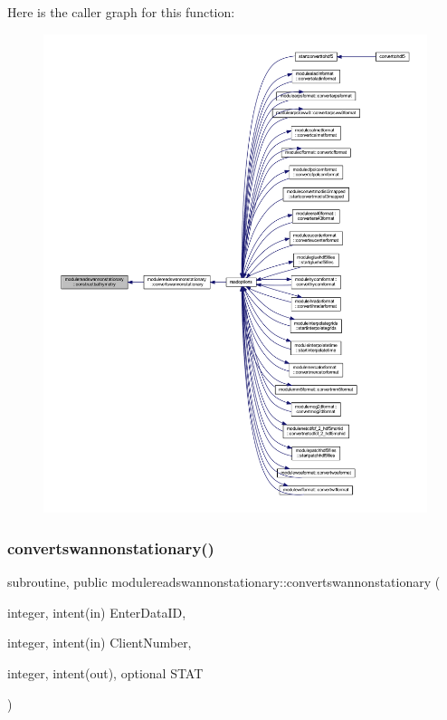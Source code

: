 Here is the caller graph for this function\+:\nopagebreak
\begin{figure}[H]
\begin{center}
\leavevmode
\includegraphics[width=350pt]{namespacemodulereadswannonstationary_a75a35cae0f8c8f39af652fdec1a65e65_icgraph}
\end{center}
\end{figure}
\mbox{\label{namespacemodulereadswannonstationary_adb8e6556bbf5f51e70fbc7c10af87a70}} 
\subsubsection{\texorpdfstring{convertswannonstationary()}{convertswannonstationary()}}
{\footnotesize\ttfamily subroutine, public modulereadswannonstationary\+::convertswannonstationary (\begin{DoxyParamCaption}\item[{integer, intent(in)}]{Enter\+Data\+ID,  }\item[{integer, intent(in)}]{Client\+Number,  }\item[{integer, intent(out), optional}]{S\+T\+AT }\end{DoxyParamCaption})}

